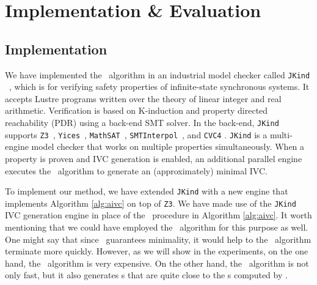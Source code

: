 \section{Implementation \& Evaluation}
\label{sec:impl}
\subsection{Implementation}
We have implemented the \aivcalg ~algorithm
in an industrial model checker called \texttt{JKind} ~\cite{jkind},
which is for verifying safety properties of  infinite-state synchronous systems.
It accepts Lustre programs \cite{Halbwachs91:lustre}
written over the theory of linear integer and real arithmetic.
Verification is based on K-induction and property directed reachability (PDR) using a back-end SMT solver.
In the
back-end, \texttt{JKind} supports \texttt{Z3}~\cite{DeMoura08:z3},
\texttt{Yices}~\cite{Dutertre06:yices}, \texttt{MathSAT}~\cite{Cimatti2013:MathSAT},
\texttt{SMTInterpol}~\cite{Christ2012:SMTInterpol}, and \texttt{CVC4} \cite{barrett2011cvc4}. \texttt{JKind} is a multi-engine model checker that works on multiple properties simultaneously. When a property is
proven and IVC generation is enabled, an additional parallel engine
executes the \ucalg ~algorithm \cite{Ghass16} to generate an (approximately) minimal IVC. 

To implement our method, we have extended \texttt{JKind} with a new engine that
implements Algorithm \ref{alg:aivc} on top of \texttt{Z3}.
We have made use of the \texttt{JKind} IVC generation engine in place of the \getivc\ procedure in  Algorithm \ref{alg:aivc}. It worth mentioning that we could have employed the \ucbfalg ~algorithm for this purpose as well.
One might say that since \ucbfalg ~guarantees minimality, it would help to the \aivcalg ~algorithm terminate more quickly.
However, as we will show in the experiments, on the one hand, the \ucbfalg ~algorithm is very expensive. On the other hand, the \ucalg ~algorithm is not only fast, but it also generates \ivc s that are
quite close to the \mivc s computed by \ucbfalg.

